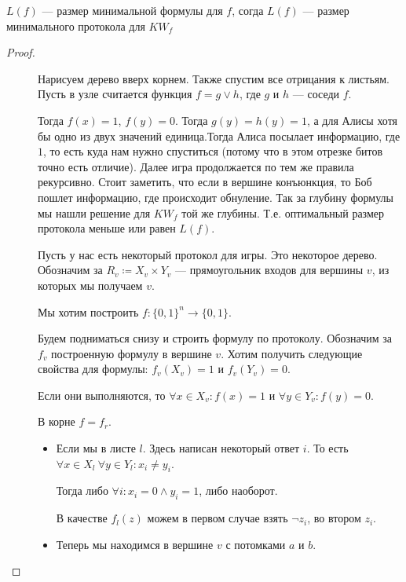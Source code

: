 \begin{thm}
	$ L(f) $ --- размер минимальной формулы для  $ f$, согда $ L(f)$ --- размер минимального протокола для  $ KW_f$
\end{thm}
\begin{proof}
    $ $
    \begin{description}
		\item [] Нарисуем дерево вверх корнем. Также спустим все отрицания к листьям. Пусть в узле считается функция $ f = g \vee h$, где  $ g$ и  $h$ --- соседи  $ f$.

			Тогда $ f(x) = 1$,  $ f(y) = 0$. Тогда $g(y) = h(y) = 1$, а для Алисы хотя бы одно из двух значений единица.Тогда Алиса посылает информацию, где $ 1$, то есть куда нам нужно спуститься (потому что в этом отрезке битов точно есть отличие). Далее игра продолжается по тем же правила рекурсивно. Стоит заметить, что если в вершине конъюнкция, то Боб пошлет информацию, где происходит обнуление. Так за глубину формулы мы нашли решение для $KW_f$ той же глубины. Т.е. оптимальный размер протокола меньше или равен $L(f)$.
		\item [] 
			Пусть у нас есть некоторый протокол для игры. Это некоторое дерево. Обозначим за $ R_v \coloneqq X_v \times Y_v$ --- прямоугольник входов для вершины $ v$, из которых мы получаем $ v$.

			Мы хотим построить $ f\colon \{0, 1\}^{n} \to \{0, 1\}$.

			Будем подниматься снизу и строить формулу по протоколу. Обозначим за $ f_v$ построенную формулу в вершине  $ v$. Хотим получить следующие свойства для формулы: $ f_v(X_v) = 1$ и  $ f_v(Y_v) = 0$.

			Если они выполняются, то $ \forall x \in X_v \colon f(x) = 1$ и $ \forall y \in Y_v \colon f(y) = 0$.

			В корне $ f = f_r$.

			\begin{itemize}
				\item Если мы в листе $ l$. Здесь написан некоторый ответ $i$. То есть $ \forall x \in X_l ~\forall y \in Y_l \colon x_i \ne  y_i$.

					Тогда либо $ \forall i \colon x_i = 0 \wedge  y_i  = 1$, либо наоборот. %

					В качестве $ f_{l}(z) $ можем в первом случае взять $ \neg z_i$, во втором $z_i$.
				\item Теперь мы находимся в вершине $ v$ с потомками  $ a $ и $ b$.


\end{itemize}
\end{description}
\end{proof}
